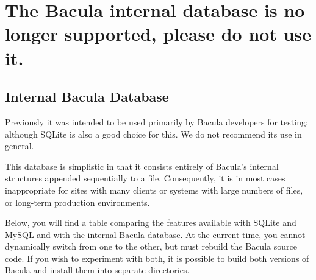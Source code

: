 
\section*{The Bacula internal database is no longer supported, please do not
use it.}
\label{_ChapterStart42}

\subsection*{Internal Bacula Database}

Previously it was intended to be used primarily by Bacula developers for
testing; although SQLite is also a good choice for this. We do not recommend
its use in general. 

This database is simplistic in that it consists entirely of Bacula's internal
structures appended sequentially to a file. Consequently, it is in most cases
inappropriate for sites with many clients or systems with large numbers of
files, or long-term production environments. 

Below, you will find a table comparing the features available with SQLite and
MySQL and with the internal Bacula database. At the current time, you cannot
dynamically switch from one to the other, but must rebuild the Bacula source
code. If you wish to experiment with both, it is possible to build both
versions of Bacula and install them into separate directories. 

